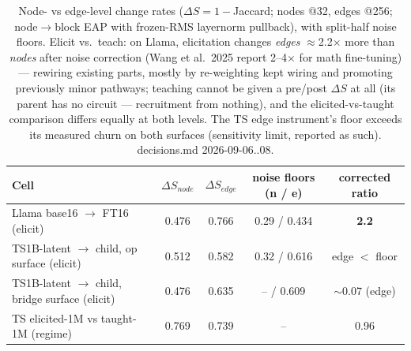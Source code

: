 \begin{table}[t]
\centering
\begin{tabular}{lcccc}
\hline
Cell & $\Delta S_{node}$ & $\Delta S_{edge}$ & noise floors (n / e) & corrected ratio \\
\hline
Llama base16 $\to$ FT16 (elicit) & 0.476 & 0.766 & 0.29 / 0.434 & \textbf{2.2} \\
TS1B-latent $\to$ child, op surface (elicit) & 0.512 & 0.582 & 0.32 / 0.616 & edge $<$ floor \\
TS1B-latent $\to$ child, bridge surface (elicit) & 0.476 & 0.635 & -- / 0.609 & $\sim$0.07 (edge) \\
TS elicited-1M vs taught-1M (regime) & 0.769 & 0.739 & -- & 0.96 \\
\hline
\end{tabular}
\caption{Node- vs edge-level change rates ($\Delta S = 1-$Jaccard; nodes @32, edges @256; node$\to$block EAP with frozen-RMS layernorm pullback), with split-half noise floors. Elicit vs.\ teach: on Llama, elicitation changes \emph{edges} $\approx$2.2$\times$ more than \emph{nodes} after noise correction (Wang et al.\ 2025 report 2--4$\times$ for math fine-tuning) --- rewiring existing parts, mostly by re-weighting kept wiring and promoting previously minor pathways; teaching cannot be given a pre/post $\Delta S$ at all (its parent has no circuit --- recruitment from nothing), and the elicited-vs-taught comparison differs equally at both levels. The TS edge instrument's floor exceeds its measured churn on both surfaces (sensitivity limit, reported as such). decisions.md 2026-09-06..08.}
\label{tab:delta_s}
\end{table}
